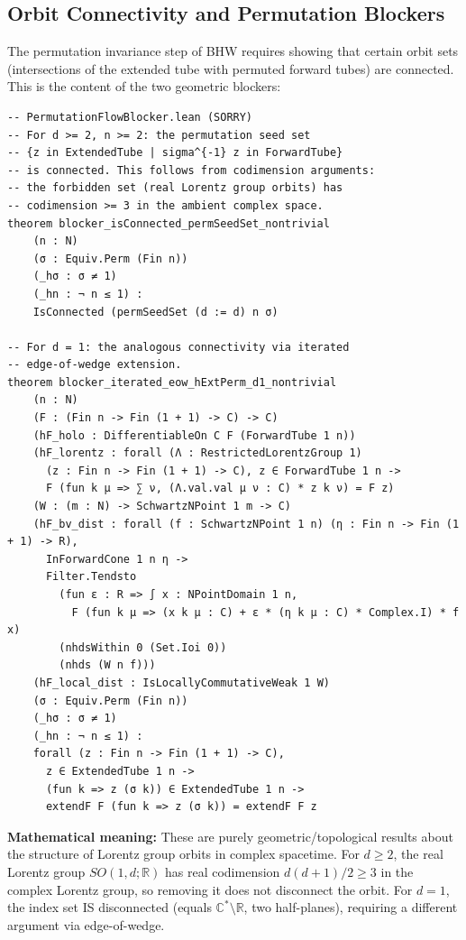 \documentclass[11pt,a4paper]{article}
\begin{document}
\subsection{Orbit Connectivity and Permutation Blockers}

The permutation invariance step of BHW requires showing that certain
orbit sets (intersections of the extended tube with permuted forward tubes)
are connected. This is the content of the two geometric blockers:

\begin{lstlisting}[style=leansorry]
-- PermutationFlowBlocker.lean (SORRY)
-- For d >= 2, n >= 2: the permutation seed set
-- {z in ExtendedTube | sigma^{-1} z in ForwardTube}
-- is connected. This follows from codimension arguments:
-- the forbidden set (real Lorentz group orbits) has
-- codimension >= 3 in the ambient complex space.
theorem blocker_isConnected_permSeedSet_nontrivial
    (n : N)
    (σ : Equiv.Perm (Fin n))
    (_hσ : σ ≠ 1)
    (_hn : ¬ n ≤ 1) :
    IsConnected (permSeedSet (d := d) n σ)

-- For d = 1: the analogous connectivity via iterated
-- edge-of-wedge extension.
theorem blocker_iterated_eow_hExtPerm_d1_nontrivial
    (n : N)
    (F : (Fin n -> Fin (1 + 1) -> C) -> C)
    (hF_holo : DifferentiableOn C F (ForwardTube 1 n))
    (hF_lorentz : forall (Λ : RestrictedLorentzGroup 1)
      (z : Fin n -> Fin (1 + 1) -> C), z ∈ ForwardTube 1 n ->
      F (fun k μ => ∑ ν, (Λ.val.val μ ν : C) * z k ν) = F z)
    (W : (m : N) -> SchwartzNPoint 1 m -> C)
    (hF_bv_dist : forall (f : SchwartzNPoint 1 n) (η : Fin n -> Fin (1 + 1) -> R),
      InForwardCone 1 n η ->
      Filter.Tendsto
        (fun ε : R => ∫ x : NPointDomain 1 n,
          F (fun k μ => (x k μ : C) + ε * (η k μ : C) * Complex.I) * f x)
        (nhdsWithin 0 (Set.Ioi 0))
        (nhds (W n f)))
    (hF_local_dist : IsLocallyCommutativeWeak 1 W)
    (σ : Equiv.Perm (Fin n))
    (_hσ : σ ≠ 1)
    (_hn : ¬ n ≤ 1) :
    forall (z : Fin n -> Fin (1 + 1) -> C),
      z ∈ ExtendedTube 1 n ->
      (fun k => z (σ k)) ∈ ExtendedTube 1 n ->
      extendF F (fun k => z (σ k)) = extendF F z
\end{lstlisting}

\noindent\textbf{Mathematical meaning:} These are purely geometric/topological
results about the structure of Lorentz group orbits in complex spacetime.
For $d \geq 2$, the real Lorentz group $SO(1,d;\mathbb{R})$ has real codimension
$d(d{+}1)/2 \geq 3$ in the complex Lorentz group, so removing it does not
disconnect the orbit. For $d = 1$, the index set IS disconnected
(equals $\mathbb{C}^* \setminus \mathbb{R}$, two half-planes), requiring
a different argument via edge-of-wedge.
\end{document}
